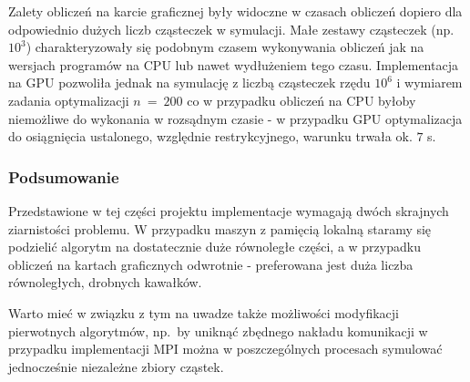 \documentclass[11pt, a4paper, oneside]{article}
\begin{document}
Zalety obliczeń na karcie graficznej były widoczne w czasach obliczeń dopiero dla odpowiednio dużych liczb cząsteczek w symulacji. Małe zestawy cząsteczek (np. $10^{3}$) charakteryzowały się podobnym czasem wykonywania obliczeń jak na wersjach programów na CPU lub nawet wydłużeniem tego czasu. Implementacja na GPU pozwoliła jednak na symulację z liczbą cząsteczek rzędu $10^{6}$ i wymiarem zadania optymalizacji $n \ = \ 200$ co w przypadku obliczeń na CPU byłoby niemożliwe do wykonania w rozsądnym czasie - w przypadku GPU optymalizacja do osiągnięcia ustalonego, względnie restrykcyjnego, warunku trwała ok. $7$ s.

\subsubsection*{Podsumowanie}
Przedstawione w tej części projektu implementacje wymagają dwóch skrajnych ziarnistości problemu. W przypadku maszyn z pamięcią lokalną staramy się podzielić algorytm na dostatecznie duże równoległe części, a w przypadku obliczeń na kartach graficznych odwrotnie - preferowana jest duża liczba równoległych, drobnych kawałków.

Warto mieć w związku z tym na uwadze także możliwości modyfikacji pierwotnych algorytmów, np.~by uniknąć zbędnego nakładu komunikacji w przypadku implementacji MPI można w poszczególnych procesach symulować jednocześnie niezależne zbiory cząstek.
\end{document}
